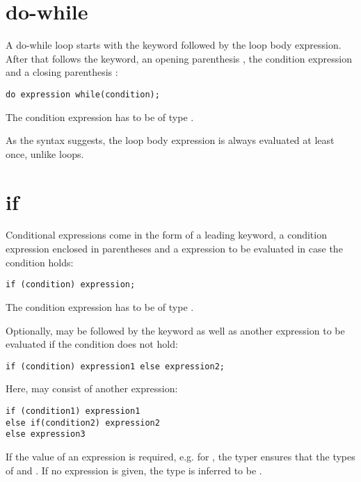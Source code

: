 \section{do-while}
\label{expression-do-while}

A do-while loop starts with the  keyword followed by the loop body expression. After that follows the  keyword, an opening parenthesis \expr{(}, the condition expression and a closing parenthesis \expr{)}:

\begin{lstlisting}
do expression while(condition);
\end{lstlisting}

The condition expression has to be of type .

As the syntax suggests, the loop body expression is always evaluated at least once, unlike  loops.

\section{if}
\label{expression-if}

Conditional expressions come in the form of a leading  keyword, a condition expression enclosed in parentheses \expr{()} and a expression to be evaluated in case the condition holds:

\begin{lstlisting}
if (condition) expression;
\end{lstlisting}

The condition expression has to be of type .

Optionally,  may be followed by the  keyword as well as another expression to be evaluated if the condition does not hold:

\begin{lstlisting}
if (condition) expression1 else expression2;
\end{lstlisting}

Here,  may consist of another  expression:

\begin{lstlisting}
if (condition1) expression1
else if(condition2) expression2
else expression3
\end{lstlisting}

If the value of an  expression is required, e.g. for , the typer ensures that the types of  and  . If no  expression is given, the type is inferred to be .


